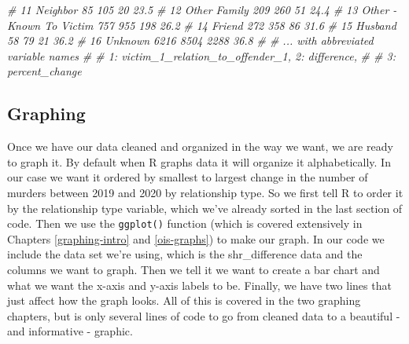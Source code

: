 \documentclass[
  a4paper,
]{krantz}
\makeatletter
\newenvironment{Shaded}{\begin{snugshade}}{\end{snugshade}}
\newcommand{\CommentTok}[1]{\textcolor[rgb]{0.37,0.37,0.37}{\textit{#1}}}
\newenvironment{kframe}{%
\medskip{}
\setlength{\fboxsep}{.8em}
 \def\at@end@of@kframe{}%
 \ifinner\ifhmode%
  \def\at@end@of@kframe{\end{minipage}}%
  \begin{minipage}{\columnwidth}%
 \fi\fi%
 \def\FrameCommand##1{\hskip\@totalleftmargin \hskip-\fboxsep
 \colorbox{shadecolor}{##1}\hskip-\fboxsep
     \hskip-\linewidth \hskip-\@totalleftmargin \hskip\columnwidth}%
 \MakeFramed {\advance\hsize-\width
   \@totalleftmargin\z@ \linewidth\hsize
   \@setminipage}}%
 {\par\unskip\endMakeFramed%
 \at@end@of@kframe}
\renewenvironment{Shaded}{\begin{kframe}}{\end{kframe}}
\makeatother
\begin{document}
\begin{Shaded}
\begin{Highlighting}[]
\CommentTok{\# 11 Neighbor                        85    105      20   23.5 }
\CommentTok{\# 12 Other Family                   209    260      51   24.4 }
\CommentTok{\# 13 Other {-} Known To Victim        757    955     198   26.2 }
\CommentTok{\# 14 Friend                         272    358      86   31.6 }
\CommentTok{\# 15 Husband                         58     79      21   36.2 }
\CommentTok{\# 16 Unknown                       6216   8504    2288   36.8 }
\CommentTok{\# \# ... with abbreviated variable names}
\CommentTok{\# \#   1: victim\_1\_relation\_to\_offender\_1, 2: difference,}
\CommentTok{\# \#   3: percent\_change}
\end{Highlighting}
\end{Shaded}

\hypertarget{graphing}{%
\subsection{Graphing}\label{graphing}}

Once we have our data cleaned and organized in the way we
want, we are ready to graph it. By default when R graphs
data it will organize it alphabetically. In our case we want
it ordered by smallest to largest change in the number of
murders between 2019 and 2020 by relationship type. So we
first tell R to order it by the relationship type variable,
which we've already sorted in the last section of code. Then
we use the \texttt{ggplot()} function (which is covered
extensively in Chapters \ref{graphing-intro} and
\ref{ois-graphs}) to make our graph. In our code we include
the data set we're using, which is the shr\_difference data
and the columns we want to graph. Then we tell it we want to
create a bar chart and what we want the x-axis and y-axis
labels to be. Finally, we have two lines that just affect
how the graph looks. All of this is covered in the two
graphing chapters, but is only several lines of code to go
from cleaned data to a beautiful - and informative -
graphic.
\end{document}

